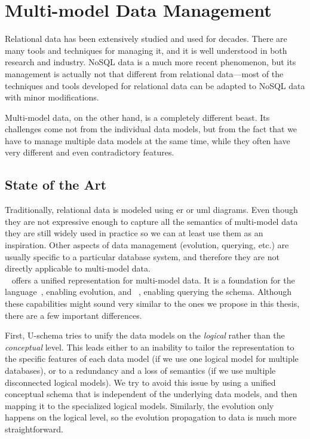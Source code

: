 \section{Multi-model Data Management}

Relational data has been extensively studied and used for decades. There are many tools and techniques for managing it, and it is well understood in both research and industry. NoSQL data is a much more recent phenomenon, but its management is actually not that different from relational data---most of the techniques and tools developed for relational data can be adapted to NoSQL data with minor modifications.

Multi-model data, on the other hand, is a completely different beast. Its challenges come not from the individual data models, but from the fact that we have to manage multiple data models at the same time, while they often have very different and even contradictory features.


\subsection{State of the Art}
\label{sec:state_of_the_art}

Traditionally, relational data is modeled using \acrshort{er} or \acrshort{uml} diagrams. Even though they are not expressive enough to capture all the semantics of multi-model data they are still widely used in practice so we can at least use them as an inspiration. Other aspects of data management (evolution, querying, etc.) are usually specific to a particular database system, and therefore they are not directly applicable to multi-model data.\\

~\citep{DBLP:journals/is/CandelRM22} offers a unified representation for multi-model data. It is a foundation for the  language~\citep{DBLP:conf/er/ChillonRM21a, 10.1109/TKDE.2024.3362273}, enabling evolution, and ~\citep{skiql}, enabling querying the schema. Although these capabilities might sound very similar to the ones we propose in this thesis, there are a few important differences.

First, U-schema tries to unify the data models on the \emph{logical} rather than the \emph{conceptual} level. This leads either to an inability to tailor the representation to the specific features of each data model (if we use one logical model for multiple databases), or to a redundancy and a loss of semantics (if we use multiple disconnected logical models). We try to avoid this issue by using a unified conceptual schema that is independent of the underlying data models, and then mapping it to the specialized logical models. Similarly, the evolution only happens on the logical level, so the evolution propagation to data is much more straightforward.

